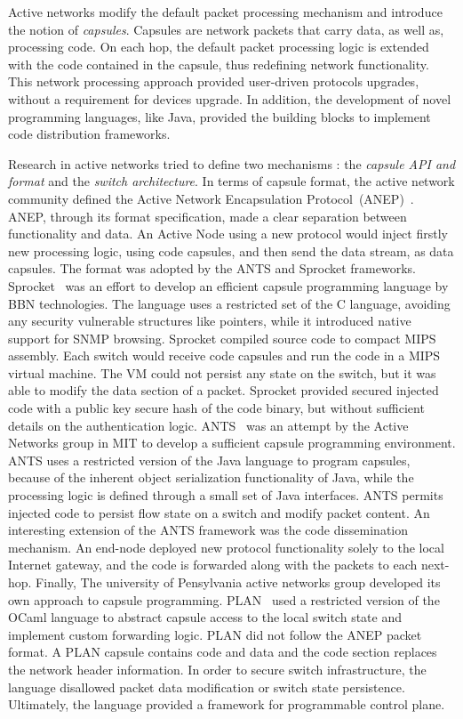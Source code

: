 Active networks modify the default packet processing mechanism and introduce the
notion of \emph{capsules}. Capsules are network packets that carry data, as
well as, processing code. On each hop, the default packet processing logic is
extended with the code contained in the capsule, thus redefining network
functionality. This network processing approach provided user-driven protocols
upgrades, without a requirement for devices upgrade.  In addition, the
development of novel programming languages, like Java, provided the
building blocks to implement code distribution frameworks.

Research in active networks tried to define two mechanisms : the \emph{capsule
  API and format} and the \emph{switch architecture}. In terms of capsule
format, the active network community defined the Active Network Encapsulation
Protocol~(ANEP)~\cite{alexander1997a}.  ANEP, through its format specification,
made a clear separation between functionality and data. An Active Node using a
new protocol would inject firstly new processing logic, using code capsules, and
then send the data stream, as data capsules.  The format was adopted by the ANTS
and Sprocket frameworks.  Sprocket~\cite{Schwartz200} was an effort to develop
an efficient capsule programming language by BBN technologies. The language uses
a restricted set of the C language, avoiding any security vulnerable structures
like pointers, while it introduced native support for SNMP browsing. Sprocket
compiled source code to compact MIPS assembly. Each switch would receive code
capsules and run the code in a MIPS virtual machine. The VM could not persist
any state on the switch, but it was able to modify the data section of a packet.
Sprocket provided secured injected code with a public key secure hash of the
code binary, but without sufficient details on the authentication logic.
ANTS~\cite{Wetherall1998} was an attempt by the Active Networks group in MIT to
develop a sufficient capsule programming environment.  ANTS uses a restricted
version of the Java language to program capsules, because of the inherent object
serialization functionality of Java, while the processing logic is defined
through a small set of Java interfaces. ANTS permits injected code to persist
flow state on a switch and modify packet content. An interesting extension of
the ANTS framework was the code dissemination mechanism. An end-node deployed
new protocol functionality solely to the local Internet gateway, and the code is
forwarded along with the packets to each next-hop. Finally, The university of
Pensylvania active networks group developed its own approach to capsule
programming.  PLAN~\cite{Hicks1998} used a restricted version of the OCaml
language to abstract capsule access to the local switch state and implement
custom forwarding logic. PLAN did not follow the ANEP packet format. A PLAN
capsule contains code and data and the code section replaces the network header
information. In order to secure switch infrastructure, the language disallowed
packet data modification or switch state persistence.  Ultimately, the language
provided a framework for programmable control plane.


